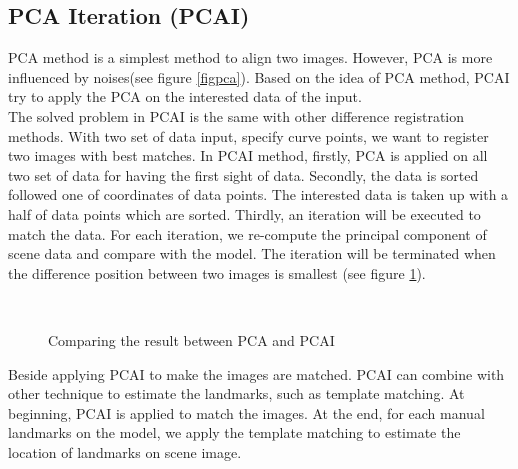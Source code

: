 \subsection{PCA Iteration (PCAI)}
PCA method is a simplest method to align two images. However, PCA is more influenced by noises(see figure \ref{figpca}). Based on the idea of PCA method, PCAI try to apply the PCA on the interested data of the input.\\[0.2cm]
The solved problem in PCAI is the same with other difference registration methods. With two set of data input, specify curve points, we want to register two images with best matches. In PCAI method, firstly, PCA is applied on all two set of data for having the first sight of data. Secondly, the data is sorted followed one of coordinates of data points. The interested data is taken up with a half of data points which are sorted. Thirdly, an iteration will be executed to match the data. For each iteration, we re-compute the principal component of scene data and compare with the model. The iteration will be terminated when the difference position between two images is smallest (see figure \ref{figpcai}).\\[0.2cm]
\begin{figure}[h!]
\centering
{}~~
\caption{Comparing the result between PCA and PCAI}
\label{figpcai}
\end{figure}
Beside applying PCAI to make the images are matched. PCAI can combine with other technique to estimate the landmarks, such as template matching. At beginning, PCAI is applied to match the images. At the end, for each manual landmarks on the model, we apply the template matching to estimate the location of landmarks on scene image. 
